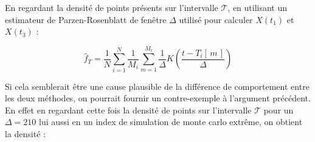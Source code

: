 En regardant la densité de points présents sur l'intervalle $\mathcal T$, en utilisant un estimateur de Parzen-Rosenblatt de fenêtre $\Delta$ utilisé pour calculer $X(t_1)$ et $X(t_3)$ :

\begin{equation*}
	\widehat f_T = \frac 1 N \sum\limits_{i=1}^N \frac 1 {M_i} \sum\limits_{m=1}^{M_i} \frac 1 \Delta K\left( \frac{t - T_i[\, m \, ]}{\Delta} \right)
\end{equation*}



Si cela semblerait être une cause plausible de la différence de comportement entre les deux méthodes, on pourrait fournir un contre-exemple à l'argument précédent. En effet en regardant cette fois la densité de points sur l'intervalle $\mathcal T$ pour un $\Delta=210$ lui aussi en un index de simulation de monte carlo extrême, on obtient la densité :